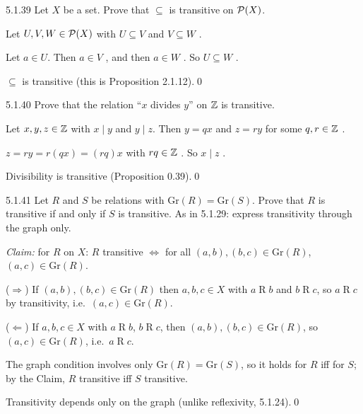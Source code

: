 \begin{bookex}[essential]{5.1.39}
Let $X$ be a set. Prove that $\subseteq$ is transitive on $\mathcal{P}(X)$.
\solution
\begin{steps}
\item Let $U,V,W\in\mathcal{P}(X)$ with $U\subseteq V$ and $V\subseteq W$ .
\item Let $a\in U$. Then $a\in V$ , and then $a\in W$ . So $U\subseteq W$ .
\end{steps}
\conclusion $\subseteq$ is transitive (this is Proposition 2.1.12).\qed
\end{bookex}

\begin{bookex}[essential]{5.1.40}
Prove that the relation ``$x$ divides $y$'' on $\mathbb{Z}$ is transitive.
\solution
\begin{steps}
\item Let $x,y,z\in\mathbb{Z}$ with $x\mid y$ and $y\mid z$. Then $y=qx$ and $z=ry$ for some $q,r\in\mathbb{Z}$ .
\item $z=ry=r(qx)=(rq)x$ with $rq\in\mathbb{Z}$ . So $x\mid z$ .
\end{steps}
\conclusion Divisibility is transitive (Proposition 0.39).\qed
\end{bookex}

\begin{bookex}[essential]{5.1.41}
Let $R$ and $S$ be relations with $\mathrm{Gr}(R)=\mathrm{Gr}(S)$. Prove that $R$ is transitive if and only if $S$ is transitive.
\solution
\plan As in 5.1.29: express transitivity through the graph only.
\begin{steps}
\item \emph{Claim:} for $R$ on $X$: $R$ transitive $\Leftrightarrow$ for all $(a,b),(b,c)\in\mathrm{Gr}(R)$, $(a,c)\in\mathrm{Gr}(R)$.
\item ($\Rightarrow$) If $(a,b),(b,c)\in\mathrm{Gr}(R)$ then $a,b,c\in X$ with $a\mathrel Rb$ and $b\mathrel Rc$, so $a\mathrel Rc$ by transitivity, i.e.\ $(a,c)\in\mathrm{Gr}(R)$.
\item ($\Leftarrow$) If $a,b,c\in X$ with $a\mathrel Rb$, $b\mathrel Rc$, then $(a,b),(b,c)\in\mathrm{Gr}(R)$, so $(a,c)\in\mathrm{Gr}(R)$, i.e.\ $a\mathrel Rc$.
\item The graph condition involves only $\mathrm{Gr}(R)=\mathrm{Gr}(S)$, so it holds for $R$ iff for $S$; by the Claim, $R$ transitive iff $S$ transitive.
\end{steps}
\conclusion Transitivity depends only on the graph (unlike reflexivity, 5.1.24).\qed
\end{bookex}

